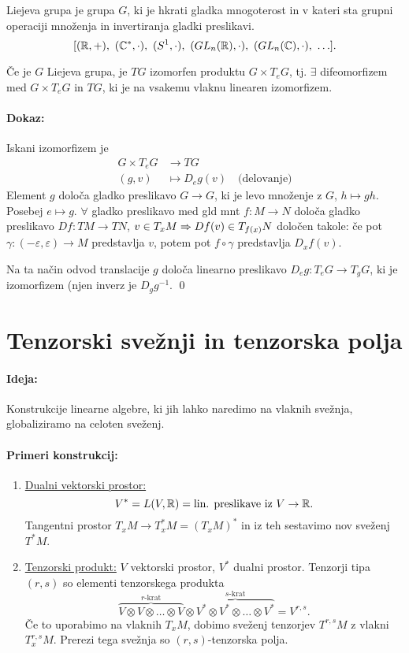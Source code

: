 \begin{zgled}
	Liejeva grupa je grupa $G$, ki je hkrati gladka mnogoterost in v kateri sta grupni operaciji mno\v zenja in invertiranja gladki
	preslikavi.
	\[
		[(\mathbb{R},+),\ (\mathbb{C}^*,\cdot),\ (S^1,\cdot),\ (GL_n(\mathbb{R}), \cdot),\ (GL_n(\mathbb{C}), \cdot),\ \ldots].
	\]
\end{zgled}

\begin{trditev}
	\v Ce je $G$ Liejeva grupa, je $TG$ izomorfen produktu $G \times T_e G$, tj. $\exists$ difeomorfizem med $G \times T_e G$ in $TG$,
	ki je na vsakemu vlaknu linearen izomorfizem.
\end{trditev}

\paragraph{Dokaz:}
Iskani izomorfizem je
\begin{align*}
	G \times T_eG &\to TG \\
	(g,v) &\mapsto D_eg(v)\quad \text{(delovanje)}
\end{align*}
Element $g$ dolo\v ca gladko preslikavo $G \to G$, ki je levo mno\v zenje z $G$, $h \mapsto gh$. Posebej $e \mapsto g$. $\forall$ gladko
preslikavo med gld mnt $f : M \to N$ dolo\v ca gladko preslikavo $Df : TM \to TN$, $v \in T_xM \Rightarrow Df(v) \in T_{f(x)}N$ dolo\v cen
takole: \v ce pot $\gamma : (-\varepsilon, \varepsilon) \to M$ predstavlja $v$, potem pot $f \circ \gamma$ predstavlja $D_x f(v)$.

Na ta na\v cin odvod translacije $g$ dolo\v ca linearno preslikavo $D_e g : T_e G \to T_g G$, ki je izomorfizem (njen inverz je $D_g g^{-1}$.
\qed

\section{Tenzorski sve\v znji in tenzorska polja}
\paragraph{Ideja:} Konstrukcije linearne algebre, ki jih lahko naredimo na vlaknih sve\v znja, globaliziramo na celoten sve\v zenj.

\paragraph{Primeri konstrukcij:}
\begin{enumerate}
	\item{\underline{Dualni vektorski prostor:}
		\[
			V^* = L(V, \mathbb{R}) = \text{lin. preslikave iz $V \to \mathbb{R}$.}
		\]
		Tangentni prostor $T_xM \to T_x^*M = (T_xM)^*$ in iz teh sestavimo nov sve\v zenj $T^*M$.}
	\item{\underline{Tenzorski produkt:}
		$V$ vektorski prostor, $V^*$ dualni prostor. Tenzorji tipa $(r,s)$ so elementi tenzorskega produkta
		\[
			\overbrace{V \otimes V \otimes \ldots \otimes V}^{r\text{-krat}}\otimes\overbrace{V^* \otimes 
				V^* \otimes \ldots \otimes V^*}^{s\text{-krat}} = V^{r,s}.
		\]
		\v Ce to uporabimo na vlaknih $T_xM$, dobimo sve\v zenj tenzorjev $T^{r,s}M$ z vlakni $T_x^{r,s}M$.
		Prerezi tega sve\v znja so $(r,s)$-tenzorska polja.}
\end{enumerate}
